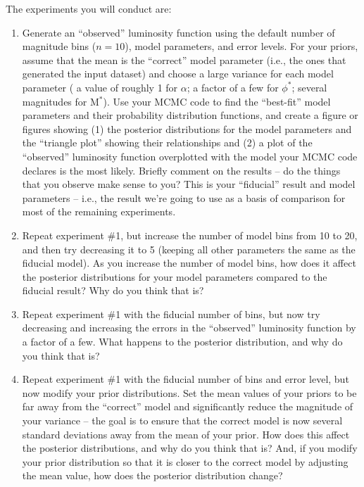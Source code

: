 \documentclass[10pt]{article}
\begin{document}
\vspace{2mm}
\noindent
The experiments you will conduct are:

\begin{enumerate}

  \item Generate an ``observed'' luminosity function using the default
number of magnitude bins ($n=10$), model parameters, and error levels.
For your priors, assume that the mean is the ``correct'' model parameter (i.e.,
the ones that generated the input dataset) and choose a large variance for each model
parameter ( a value of roughly 1 for $\alpha$; a factor of a few for $\phi^*$; several magnitudes for
M$^*$).  Use your MCMC code to find
the ``best-fit'' model parameters and their probability distribution
functions, and create a figure or figures showing (1) the posterior
distributions for the model parameters and the ``triangle plot''
showing their relationships and (2) a plot of the ``observed''
luminosity function overplotted with the model your MCMC code declares
is the most likely.  Briefly comment on the results -- do the things
that you observe make sense to you?  This is your ``fiducial'' result
and model parameters -- i.e., the result we're going to use as a basis
of comparison for most of the remaining experiments.

\item Repeat experiment \#1, but increase the number of model bins
  from 10 to 20, and then try decreasing it to 5 (keeping all other
  parameters the same as the fiducial model).  As you increase the number of
  model bins, how does it affect the posterior distributions for your
  model parameters compared to the fiducial result?  Why do you think
  that is?

\item Repeat experiment \#1 with the fiducial number of bins, but now
try decreasing and increasing the errors in the ``observed''
luminosity function by a factor of a few.  What happens to the
posterior distribution, and why do you think that is?

\item Repeat experiment \#1 with the fiducial number of bins and error
level, but now modify your prior distributions.  Set the mean values
of your priors to be far away from the ``correct'' model and
significantly reduce the magnitude of your variance -- the goal is to
ensure that the correct model is now several standard deviations away
from the mean of your prior.  How does this affect the posterior
distributions, and why do you think that is?  And, if you modify your
prior distribution so that it is closer to the correct model by
adjusting the mean value, how does the posterior distribution change? 


\end{enumerate}
\end{document}

